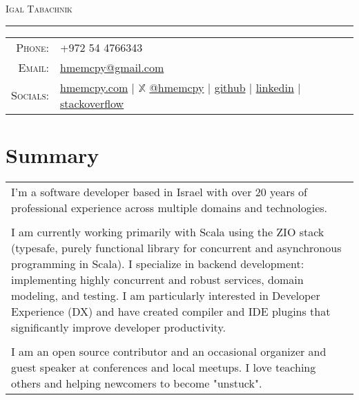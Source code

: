 \documentclass[a4paper,11pt]{article}
\begin{document}
\par{\centering
		{\Huge \textsc{Igal Tabachnik}
	}\bigskip\par}

\hrule
\vspace{0.5em}
\begin{tabular}{rl}
  \textsc{Phone:}     & +972 54 4766343\\
  \textsc{Email:}     & \href{mailto:hmemcpy@gmail.com}{hmemcpy@gmail.com}\\
  \textsc{Socials:}   & \faHome{} \href{https://hmemcpy.com}{hmemcpy.com} 
                      | $\mathbb{X}$ \href{https://twitter.com/hmemcpy}{@hmemcpy}
                      | \faGithub{} \href{https://github.com/hmemcpy}{github}
                      | \faLinkedin{} \href{https://www.linkedin.com/in/igaltabachnik/}{linkedin}
                      | \faStackOverflow{} \href{https://stackoverflow.com/users/8205/igal-tabachnik}{stackoverflow}
\end{tabular}

\section{Summary}
\begin{tabular}{p{}}
  I'm a software developer based in Israel with over 20 years of professional experience across multiple domains and technologies.\\\\

  I am currently working primarily with Scala using the ZIO stack (typesafe, purely functional library for concurrent and asynchronous programming in Scala). I specialize in backend development: implementing highly concurrent and robust services, domain modeling, and testing. I am particularly interested in Developer Experience (DX) and have created compiler and IDE plugins that significantly improve developer productivity.\\\\

  I am an open source contributor and an occasional organizer and guest speaker at conferences and local meetups. I love teaching others and helping newcomers to become "unstuck".
\end{tabular}
\end{document}
